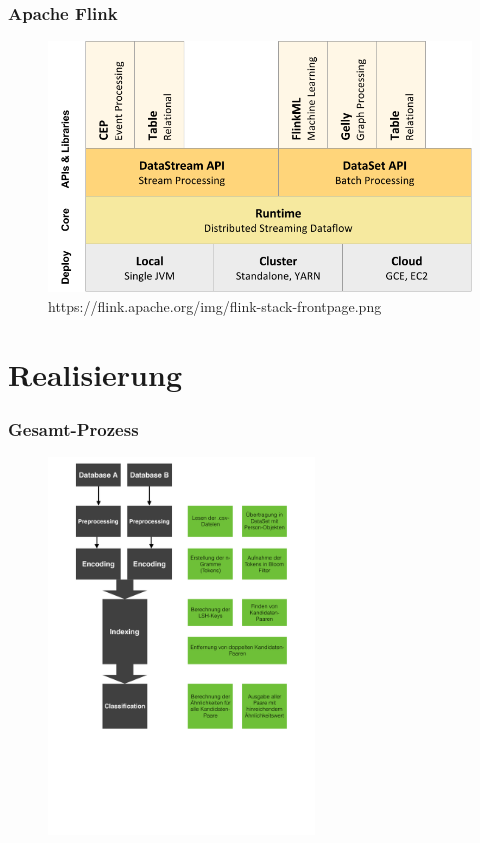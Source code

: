 \documentclass{beamer}
\begin{document}
    \begin{frame}
    		\frametitle{Apache Flink}
            \begin{figure}[H]
                \includegraphics[width=\textwidth]{graphics/flink_stack.png}
                \caption{https://flink.apache.org/img/flink-stack-frontpage.png}
            \end{figure}
    \end{frame}
    \section[Section]{Realisierung}
    
    \begin{frame}
    		\frametitle{Gesamt-Prozess}
    		\begin{figure}[H]
    			\includegraphics[height=10cm]{graphics/pprl.pdf}
    		\end{figure}
    \end{frame}
    
\end{document}
